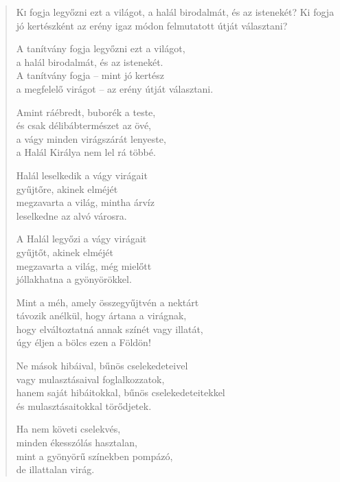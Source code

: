 
\begin{verse}

{\par%
\lettrine[slope=0.5em]{K}{i} {\LettrineTextFont fogja legyőzni ezt a világot,}\newline
a halál birodalmát, és az istenekét?\newline
Ki fogja jó kertészként az erény\verselinebreak
igaz módon felmutatott útját választani?
\par}

 A tanítvány fogja legyőzni ezt a világot,\\
a halál birodalmát, és az istenekét.\\
A tanítvány fogja – mint jó kertész\\
a megfelelő virágot – az erény útját választani.

 Amint ráébredt, buborék a teste,\\
és csak délibábtermészet az övé,\\
a vágy minden virágszárát lenyeste,\\
a Halál Királya nem lel rá többé.

 Halál leselkedik a vágy virágait\\
gyűjtőre, akinek elméjét\\
megzavarta a világ, mintha árvíz\\
leselkedne az alvó városra.

 A Halál legyőzi a vágy virágait\\
gyűjtőt, akinek elméjét\\
megzavarta a világ, még mielőtt\\
jóllakhatna a gyönyörökkel.

 Mint a méh, amely összegyűjtvén a nektárt\\
távozik anélkül, hogy ártana a virágnak,\\
hogy elváltoztatná annak színét vagy illatát,\\
úgy éljen a bölcs ezen a Földön!

 Ne mások hibáival, bűnös cselekedeteivel\\
vagy mulasztásaival foglalkozzatok,\\
hanem saját hibáitokkal, bűnös cselekedeteitekkel\\
és mulasztásaitokkal törődjetek.

 Ha nem követi cselekvés,\\
minden ékesszólás hasztalan,\\
mint a gyönyörű színekben pompázó,\\
de illattalan virág.


\end{verse}
